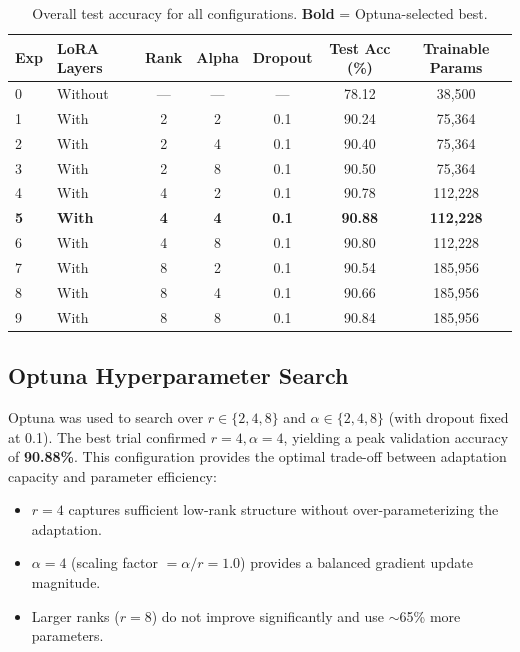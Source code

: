 \documentclass[11pt,a4paper]{article}
\begin{document}
\begin{table}[H]
\centering
\begin{tabular}{@{}llccccc@{}}
\toprule
\textbf{Exp} & \textbf{LoRA Layers} & \textbf{Rank} & \textbf{Alpha} & \textbf{Dropout} & \textbf{Test Acc (\%)} & \textbf{Trainable Params} \\
\midrule
0 & Without & --- & --- & ---  & 78.12 & 38,500 \\
1 & With    & 2   & 2   & 0.1  & 90.24 & 75,364 \\
2 & With    & 2   & 4   & 0.1  & 90.40 & 75,364 \\
3 & With    & 2   & 8   & 0.1  & 90.50 & 75,364 \\
4 & With    & 4   & 2   & 0.1  & 90.78 & 112,228 \\
\textbf{5} & \textbf{With} & \textbf{4} & \textbf{4} & \textbf{0.1} & \textbf{90.88} & \textbf{112,228} \\
6 & With    & 4   & 8   & 0.1  & 90.80 & 112,228 \\
7 & With    & 8   & 2   & 0.1  & 90.54 & 185,956 \\
8 & With    & 8   & 4   & 0.1  & 90.66 & 185,956 \\
9 & With    & 8   & 8   & 0.1  & 90.84 & 185,956 \\
\bottomrule
\end{tabular}
\caption{Overall test accuracy for all configurations. \textbf{Bold} = Optuna-selected best.}
\end{table}

\subsection{Optuna Hyperparameter Search}

Optuna was used to search over $r \in \{2,4,8\}$ and $\alpha \in \{2,4,8\}$ (with dropout fixed at 0.1). The best trial confirmed $r=4, \alpha=4$, yielding a peak validation accuracy of \textbf{90.88\%}. This configuration provides the optimal trade-off between adaptation capacity and parameter efficiency:
\begin{itemize}
  \item $r=4$ captures sufficient low-rank structure without over-parameterizing the adaptation.
  \item $\alpha=4$ (scaling factor $= \alpha/r = 1.0$) provides a balanced gradient update magnitude.
  \item Larger ranks ($r=8$) do not improve significantly and use $\sim$65\% more parameters.
\end{itemize}
\end{document}
